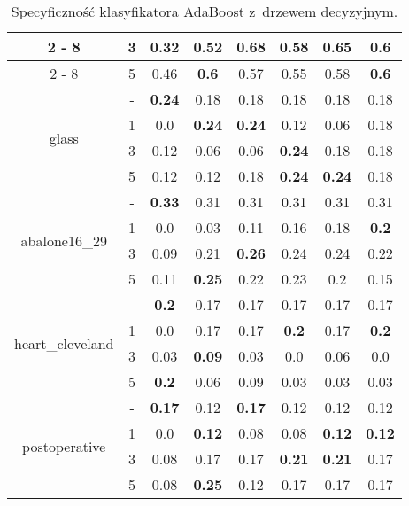\begin{table}[H]
\begin{center}
{\begin{tabular}{c|c|cccccc}
					\cline{2%
						-%
						8}%
					&3&0.32&0.52&\textbf{0.68}&0.58&0.65&0.6\\%
					\cline{2%
						-%
						8}%
					&5&0.46&\textbf{0.6}&0.57&0.55&0.58&\textbf{0.6}\\%
					\hline%
					\multirow{4}{*}{glass}&{-}&\textbf{0.24}&0.18&0.18&0.18&0.18&0.18\\%
					\cline{2%
						-%
						8}%
					&1&0.0&\textbf{0.24}&\textbf{0.24}&0.12&0.06&0.18\\%
					\cline{2%
						-%
						8}%
					&3&0.12&0.06&0.06&\textbf{0.24}&0.18&0.18\\%
					\cline{2%
						-%
						8}%
					&5&0.12&0.12&0.18&\textbf{0.24}&\textbf{0.24}&0.18\\%
					\hline%
					\multirow{4}{*}{abalone16\_29}&{-}&\textbf{0.33}&0.31&0.31&0.31&0.31&0.31\\%
					\cline{2%
						-%
						8}%
					&1&0.0&0.03&0.11&0.16&0.18&\textbf{0.2}\\%
					\cline{2%
						-%
						8}%
					&3&0.09&0.21&\textbf{0.26}&0.24&0.24&0.22\\%
					\cline{2%
						-%
						8}%
					&5&0.11&\textbf{0.25}&0.22&0.23&0.2&0.15\\%
					\hline%
					\multirow{4}{*}{heart\_cleveland}&{-}&\textbf{0.2}&0.17&0.17&0.17&0.17&0.17\\%
					\cline{2%
						-%
						8}%
					&1&0.0&0.17&0.17&\textbf{0.2}&0.17&\textbf{0.2}\\%
					\cline{2%
						-%
						8}%
					&3&0.03&\textbf{0.09}&0.03&0.0&0.06&0.0\\%
					\cline{2%
						-%
						8}%
					&5&\textbf{0.2}&0.06&0.09&0.03&0.03&0.03\\%
					\hline%
					\multirow{4}{*}{postoperative}&{-}&\textbf{0.17}&0.12&\textbf{0.17}&0.12&0.12&0.12\\%
					\cline{2%
						-%
						8}%
					&1&0.0&\textbf{0.12}&0.08&0.08&\textbf{0.12}&\textbf{0.12}\\%
					\cline{2%
						-%
						8}%
					&3&0.08&0.17&0.17&\textbf{0.21}&\textbf{0.21}&0.17\\%
					\cline{2%
						-%
						8}%
					&5&0.08&\textbf{0.25}&0.12&0.17&0.17&0.17\\%
					\hline%
					\end{tabular}}
					
					\caption{Specyficzność klasyfikatora AdaBoost z~drzewem decyzyjnym.}
					\label{adaspecyficznosc}
				\end{center}
			\end{table}

